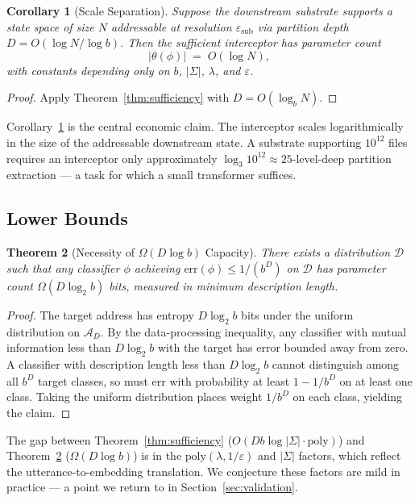 \documentclass[11pt,a4paper]{article}
\newtheorem{theorem}{Theorem}[section]
\newtheorem{corollary}[theorem]{Corollary}
\theoremstyle{definition}
\theoremstyle{remark}
\begin{document}
\begin{corollary}[Scale Separation]
\label{cor:scale}
Suppose the downstream substrate supports a state space of size $N$ addressable at resolution $\varepsilon_{\text{sub}}$ via partition depth $D = O(\log N / \log b)$. Then the sufficient interceptor has parameter count
\[
|\theta(\phi)| \;=\; O(\log N),
\]
with constants depending only on $b$, $|\Sigma|$, $\lambda$, and $\varepsilon$.
\end{corollary}

\begin{proof}
Apply Theorem~\ref{thm:sufficiency} with $D = O(\log_b N)$.
\end{proof}

Corollary~\ref{cor:scale} is the central economic claim. The interceptor scales logarithmically in the size of the addressable downstream state. A substrate supporting $10^{12}$ files requires an interceptor only approximately $\log_3 10^{12} \approx 25$-level-deep partition extraction --- a task for which a small transformer suffices.

\subsection{Lower Bounds}

\begin{theorem}[Necessity of $\Omega(D \log b)$ Capacity]
\label{thm:necessity}
There exists a distribution $\mathcal{D}$ such that any classifier $\phi$ achieving $\mathrm{err}(\phi) \leq 1/(b^D)$ on $\mathcal{D}$ has parameter count $\Omega(D \log_2 b)$ bits, measured in minimum description length.
\end{theorem}

\begin{proof}
The target address has entropy $D \log_2 b$ bits under the uniform distribution on $\mathcal{A}_D$. By the data-processing inequality, any classifier with mutual information less than $D \log_2 b$ with the target has error bounded away from zero. A classifier with description length less than $D \log_2 b$ cannot distinguish among all $b^D$ target classes, so must err with probability at least $1 - 1/b^D$ on at least one class. Taking the uniform distribution places weight $1/b^D$ on each class, yielding the claim.
\end{proof}

The gap between Theorem~\ref{thm:sufficiency} ($O(D b \log |\Sigma| \cdot \mathrm{poly})$) and Theorem~\ref{thm:necessity} ($\Omega(D \log b)$) is in the $\mathrm{poly}(\lambda, 1/\varepsilon)$ and $|\Sigma|$ factors, which reflect the utterance-to-embedding translation. We conjecture these factors are mild in practice --- a point we return to in Section~\ref{sec:validation}.
\end{document}
